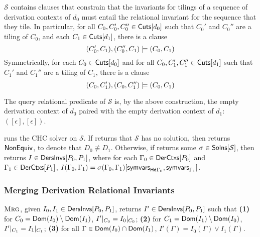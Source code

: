 $\mathcal{S}$ contains clauses that constrain that the invariants for
tilings of a sequence of derivation contexts of $d_0$ must entail the
relational invariant for the sequence that they tile.
%
In particular, for all $C_0, C_0', C_0'' \in \mathsf{Cuts}[ d_0 ]$ such that
$C_0'$ and $C_0''$ are a tiling of $C_0$, and %
each $C_1 \in \mathsf{Cuts}[ d_1 ]$, there is a clause
\[ (C_0', C_1), (C_0'', C_1) \models (C_0, C_1)
\]
%
Symmetrically, for each $C_0 \in \mathsf{Cuts}[ d_0 ]$ and %
for all $C_0, C_1', C_1'' \in \mathsf{Cuts}[ d_1 ]$ such that $C_1'$ and $C_1''$
are a tiling of $C_1$, %
there is a clause 
\[ (C_0, C_1'), (C_0, C_1'') \models (C_0, C_1)
\]

The query relational predicate of $\mathcal{S}$ is, by the above
construction, the empty derivation context of $d_0$ paired with the
empty derivation context of $d_1$: $( [ \epsilon ], [ \epsilon ])$.

\verifyders runs the CHC solver \solvechc on $\mathcal{S}$.
%
If \solvechc returns that $\mathcal{S}$ has no solution, then
\verifyders returns $\mathsf{NonEquiv}$, to denote that $D_0 \not\equiv D_1$.
%
Otherwise, if \solvechc returns some $\sigma \in \mathsf{Solns}[ 
  \mathcal{S}  ]$, then \verifyders returns $I \in
\mathsf{DersInvs}[ P_0, P_1 ]$, where for each $\Gamma_0 \in \mathsf{DerCtxs}[  P_0  ]$
and $\Gamma_1 \in \mathsf{DerCtxs}[  P_1  ]$, $I(\Gamma_0, \Gamma_1) = 
  \sigma(\Gamma_0, \Gamma_1)  [  \mathsf{symvars}_{ \mathsf{Hd}{ \Gamma_0 } },
  \mathsf{symvars}_{ \Gamma_1 }  ]$.

\subsubsection{Merging Derivation Relational Invariants}
$\textsc{Mrg}$, given $I_0, I_1 \in \mathsf{DersInvs}[ P_0, P_1 ]$, returns $I'
\in \mathsf{DersInvs}[ P_0, P_1 ]$ such that
\textbf{(1)} for $C_0 = \mathsf{Dom}(I_0) \setminus \mathsf{Dom}(I_1)$,
$I'|_{C_0} = I_0|_{C_0}$; 
\textbf{(2)} for $C_1 = \mathsf{Dom}(I_1) \setminus \mathsf{Dom}(I_0)$,
$I'|_{C_1} = I_1|_{C_1}$;
\textbf{(3)} for all $\Gamma \in \mathsf{Dom}(I_0) \cap
\mathsf{Dom}(I_1)$, $I'(\Gamma) = I_0(\Gamma) \lor I_1(\Gamma)$.

